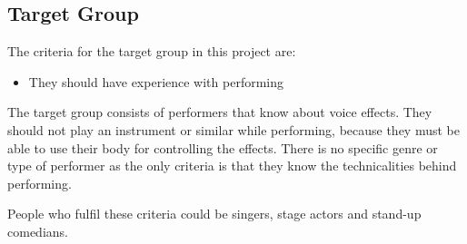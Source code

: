 \subsection{Target Group}
The criteria for the target group in this project are:

\begin{itemize}
	\item They should have experience with performing 
\end{itemize}

The target group consists of performers that know about voice effects. They should not play an instrument or similar while performing, because they must be able to use their body for controlling the effects. There is no specific genre or type of performer as the only criteria is that they know the technicalities behind performing.

People who fulfil these criteria could be singers, stage actors and stand-up comedians.